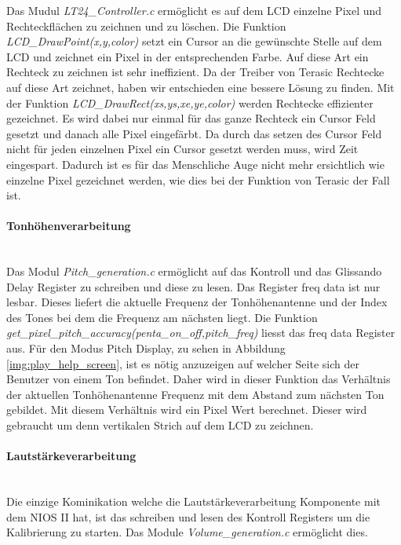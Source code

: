 Das Mudul \textit{LT24\_Controller.c} ermöglicht es auf dem LCD einzelne Pixel und Rechteckflächen zu zeichnen und zu löschen. Die Funktion \textit{LCD\_DrawPoint(x,y,color)} setzt ein Cursor an die gewünschte Stelle auf dem LCD und zeichnet ein Pixel in der entsprechenden Farbe. Auf diese Art ein Rechteck zu zeichnen ist sehr ineffizient. Da der Treiber von Terasic Rechtecke auf diese Art zeichnet, haben wir entschieden eine bessere Lösung zu finden. Mit der Funktion \textit{LCD\_DrawRect(xs,ys,xe,ye,color)}  werden Rechtecke effizienter gezeichnet. Es wird dabei nur einmal für das ganze Rechteck ein Cursor Feld gesetzt und danach alle Pixel eingefärbt. Da durch das setzen des Cursor Feld nicht für jeden einzelnen Pixel ein Cursor gesetzt werden muss, wird  Zeit eingespart. Dadurch ist es für das Menschliche Auge nicht mehr ersichtlich wie einzelne Pixel gezeichnet werden, wie dies bei der Funktion von Terasic der Fall ist. 

\paragraph{Tonhöhenverarbeitung}\mbox{}\\
Das Modul \textit{Pitch\_generation.c} ermöglicht auf das Kontroll und das Glissando Delay Register zu schreiben und diese zu lesen. Das Register freq data ist nur lesbar. Dieses liefert die aktuelle Frequenz der Tonhöhenantenne und der Index des Tones bei dem die Frequenz am nächsten liegt. 
Die Funktion \textit{get\_pixel\_pitch\_accuracy(penta\_on\_off,pitch\_freq)} liesst das freq data Register aus. Für den Modus Pitch Display, zu sehen in Abbildung \ref{img:play_help_screen}, ist es nötig anzuzeigen auf welcher Seite sich der Benutzer von einem Ton befindet. Daher wird in dieser Funktion das Verhältnis der aktuellen Tonhöhenantenne Frequenz mit dem Abstand zum nächsten Ton gebildet. Mit diesem Verhältnis wird ein Pixel Wert berechnet. Dieser wird gebraucht um denn vertikalen Strich auf dem LCD zu zeichnen.


\paragraph{Lautstärkeverarbeitung}\mbox{}\\
Die einzige Kominikation welche die Lautstärkeverarbeitung Komponente mit dem NIOS II hat, ist das schreiben und lesen des Kontroll Registers um die Kalibrierung zu starten. Das Module  \textit{Volume\_generation.c} ermöglicht dies. 